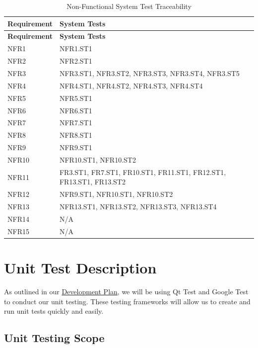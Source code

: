 \documentclass[12pt, titlepage]{article}
\begin{document}
\begin{longtable}[H]{|p{} | p{}|}
  \caption{Non-Functional System Test Traceability}
  \label{TblNFRSTTraceability}\\
  \hline
  \textbf{Requirement} & \textbf{System Tests}\\
  \hline
  \endfirsthead
  \hline
  \textbf{Requirement} & \textbf{System Tests}\\
  \hline
  \endhead
  NFR1 & NFR1.ST1\\
  \hline
  NFR2 & NFR2.ST1\\
  \hline
  NFR3 & NFR3.ST1, NFR3.ST2, NFR3.ST3, NFR3.ST4, NFR3.ST5\\
  \hline
  NFR4 & NFR4.ST1, NFR4.ST2, NFR4.ST3, NFR4.ST4\\
  \hline
  NFR5 & NFR5.ST1\\
  \hline
  NFR6 & NFR6.ST1\\
  \hline
  NFR7 & NFR7.ST1\\
  \hline
  NFR8 & NFR8.ST1\\
  \hline
  NFR9 & NFR9.ST1\\
  \hline
  NFR10 & NFR10.ST1, NFR10.ST2\\
  \hline
  NFR11 & FR3.ST1, FR7.ST1, FR10.ST1, FR11.ST1, FR12.ST1, FR13.ST1, FR13.ST2\\
  \hline
  NFR12 & NFR9.ST1, NFR10.ST1, NFR10.ST2\\
  \hline
  NFR13 & NFR13.ST1, NFR13.ST2, NFR13.ST3, NFR13.ST4\\
  \hline
  NFR14 & N/A\\
  \hline
  NFR15 & N/A\\
  \hline
\end{longtable}


\section{Unit Test Description}

As outlined in our \href{https://github.com/agentvv/MTOBridge/blob/main/docs/DevelopmentPlan/DevelopmentPlan.pdf}{Development Plan}, we will be using Qt Test and Google Test to conduct our unit testing. These testing frameworks will allow us to create and run unit tests quickly and easily.

\subsection{Unit Testing Scope}

\end{document}

